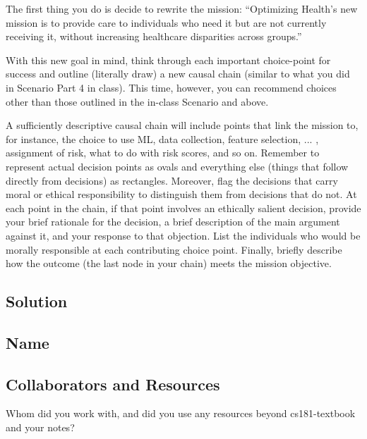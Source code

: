 \documentclass[submit]{harvardml}
\begin{document}
\begin{problem}
The first thing you do is decide to rewrite the mission: “Optimizing Health’s new mission is to provide care to individuals who need it but are not currently receiving it, without increasing healthcare disparities across groups.”

With this new goal in mind, think through each important choice-point for success and outline (literally draw) a new causal chain (similar to what you did in Scenario Part 4 in class). This time, however, you can recommend choices other than those outlined in the in-class Scenario and above. 

A sufficiently descriptive causal chain will include points that link the mission to, for instance, the choice to use ML, data collection, feature selection, ... , assignment of risk, what to do with risk scores, and so on. Remember to represent actual decision points as ovals and everything else (things that follow directly from decisions) as rectangles. Moreover, flag the decisions that carry moral or ethical responsibility to distinguish them from decisions that do not. At each point in the chain, if that point involves an ethically salient decision, provide your brief rationale for the decision, a brief description of the main argument against it, and your response to that objection. List the individuals who would be morally responsible at each contributing choice point. Finally, briefly describe how the outcome (the last node in your chain) meets the mission objective.


\end{problem}

\subsection*{Solution}




\newpage
\subsection*{Name}

\subsection*{Collaborators and Resources}
Whom did you work with, and did you use any resources beyond cs181-textbook and your notes?
\end{document}
